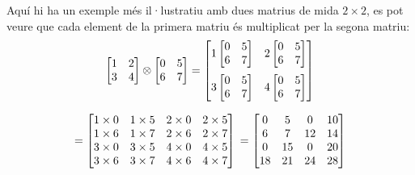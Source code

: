 Aquí hi ha un exemple més il·lustratiu amb dues matrius de mida $2\times2$, es pot veure que cada element de la primera matriu és multiplicat per la segona matriu:
\begin{equation*}
\begin{bmatrix}
	1 & 2 \\
	3 & 4 \\
\end{bmatrix} \otimes
\begin{bmatrix}
	0 & 5 \\
	6 & 7 \\
\end{bmatrix} =
\begin{bmatrix}
1 \begin{bmatrix}
	0 & 5 \\
	6 & 7 \\
\end{bmatrix} & 
2 \begin{bmatrix}
	0 & 5 \\
	6 & 7 \\
\end{bmatrix} \vspace{6pt} \\ 
3 \begin{bmatrix}
	0 & 5 \\
	6 & 7 \\
\end{bmatrix} & 
4 \begin{bmatrix}
	0 & 5 \\
	6 & 7 \\
\end{bmatrix}
\end{bmatrix}
\end{equation*}

\begin{equation*}
	= 
\begin{bmatrix}
1\times 0 & 1\times 5 & 2\times 0 & 2\times 5 \\
1\times 6 & 1\times 7 & 2\times 6 & 2\times 7 \\
3\times 0 & 3\times 5 & 4\times 0 & 4\times 5 \\
3\times 6 & 3\times 7 & 4\times 6 & 4\times 7 \\
\end{bmatrix} \\
= 
\begin{bmatrix}
0 &  5 &  0 & 10 \\
6 &  7 & 12 & 14 \\
0 & 15 &  0 & 20 \\
18 & 21 & 24 & 28
\end{bmatrix}
\end{equation*}

